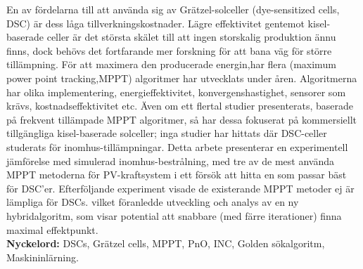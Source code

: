 En av fördelarna till att använda sig av Grätzel-solceller (dye-sensitized cells, DSC)  är dess låga tillverkningskostnader. Lägre effektivitet gentemot kisel-baserade celler är det största skälet till att ingen storskalig produktion ännu finns, dock behövs det fortfarande mer forskning för att bana väg för större tillämpning. För att maximera den producerade energin,har flera (maximum power point tracking,MPPT) algoritmer har utvecklats under åren.  Algoritmerna har olika implementering, energieffektivitet, konvergenshastighet, sensorer som krävs, kostnadseffektivitet etc. Även om ett flertal studier presenterats, baserade på frekvent tillämpade MPPT algoritmer, så har dessa fokuserat på kommersiellt tillgängliga kisel-baserade solceller; inga studier har hittats där DSC-celler studerats för inomhus-tillämpningar. Detta arbete presenterar en experimentell jämförelse med simulerad inomhus-bestrålning, med tre av de mest använda MPPT metoderna för PV-kraftsystem i ett försök att hitta en som passar bäst för DSC’er. Efterföljande experiment visade de existerande MPPT metoder ej är lämpliga för DSCs. vilket föranledde utveckling och analys av en ny hybridalgoritm, som visar potential att snabbare (med färre iterationer) finna maximal effektpunkt.\\

{\bf Nyckelord:} DSCs, Grätzel cells, MPPT, PnO, INC, Golden sökalgoritm, Maskininlärning. 
\acresetall
